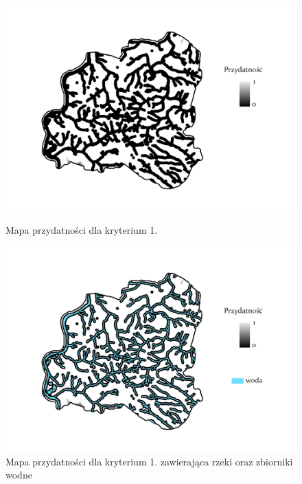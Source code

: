 \documentclass{article}
\begin{document}
\begin{figure}[H]
    \begin{minipage}[t]{0.48\textwidth}
        \centering
        \includegraphics[width=\linewidth]{img/plesna-kryterium1-layout.jpg}
        \caption{Mapa przydatności dla kryterium 1.}
        \label{fig:kryterium1-layout}
    \end{minipage}
    \hfill
    \begin{minipage}[t]{0.48\textwidth}
        \centering
        \includegraphics[width=\linewidth]{img/plesna-kryterium1-woda.jpg}
        \caption{Mapa przydatności dla kryterium 1. zawierająca rzeki oraz zbiorniki wodne}
        \label{fig:kryterium1-woda}
    \end{minipage}
\end{figure}
\end{document}
